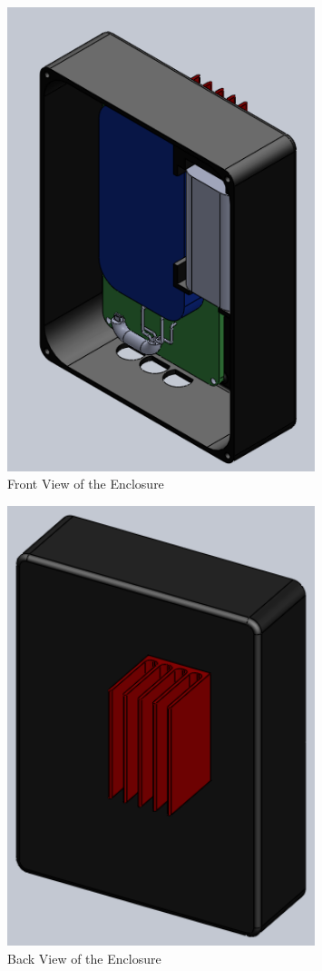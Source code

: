 \documentclass{article}
\numberwithin{figure}{section}
\numberwithin{equation}{section}
\begin{document}
{\begin{figure}[H]
	\centering
	\includegraphics[width=0.8\textwidth]{Assembly2}
	\caption{Front View of the Enclosure}
	\label{fig:append_enclosurefront}
\end{figure}

\begin{figure}[H]
	\centering
	\includegraphics[width=0.8\textwidth]{Assembly3}
	\caption{Back View of the Enclosure}
	\label{fig:append_enclosureback}
\end{figure}

}
\end{document}
